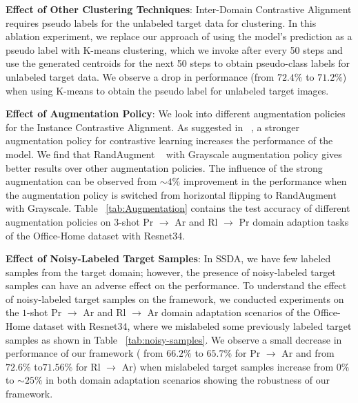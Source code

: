 \noindent\textbf{Effect of Other Clustering Techniques}: Inter-Domain Contrastive Alignment requires pseudo labels for the unlabeled target data for clustering. In this ablation experiment, we replace our approach of using the model's prediction as a pseudo label with K-means clustering, which we invoke after every 50 steps and use the generated centroids for the next 50 steps to obtain pseudo-class labels for unlabeled target data. We observe a drop in performance (from $72.4\%$ to $71.2\%$) when using K-means to obtain the pseudo label for unlabeled target images. 


\noindent \textbf{ Effect of Augmentation Policy}:
We look into different augmentation policies for the Instance Contrastive Alignment. As suggested in ~\cite{Chen2020ASF}, a stronger augmentation policy for contrastive learning increases the performance of the model. We find that RandAugment ~\cite{Cubuk2020RandaugmentPA} with Grayscale augmentation policy gives better results over other augmentation policies. The influence of the strong augmentation can be observed from  $\sim 4\%$ improvement in the performance when the augmentation policy is switched from horizontal flipping to RandAugment with Grayscale. Table ~\ref{tab:Augmentation} contains the test accuracy of different augmentation policies on $3$-shot Pr $\rightarrow$ Ar and Rl $\rightarrow$ Pr domain adaption tasks of the Office-Home dataset with Resnet34.


\noindent \textbf{ Effect of Noisy-Labeled Target Samples}: In SSDA, we have few labeled samples from the target domain; however, the presence of noisy-labeled target samples can have an adverse effect on the performance. To understand the effect of noisy-labeled target samples on the framework, we conducted experiments on the $1$-shot Pr $\rightarrow$ Ar and Rl $\rightarrow$ Ar domain adaptation scenarios of the Office-Home dataset with Resnet34, where we mislabeled some previously labeled target samples as shown in Table ~\ref{tab:noisy-samples}. We observe a small decrease in performance of our framework ( from $66.2\%$ to $65.7\%$ for Pr $\rightarrow$ Ar and from  $72.6\%$ to$71.56\%$ for Rl $\rightarrow$ Ar) when mislabeled target samples increase from $0\%$ to $\sim 25\%$ in both domain adaptation scenarios showing the robustness of our framework.
\begin{table}[t]
\renewcommand{\arraystretch}{1.2}
    \centering
    \caption{\textbf{Ablation study to understand the effect of outliers in target domain.} Numbers show the test accuracy of $1$-shot domain adaptation tasks of the Office-Home dataset with Resnet34.}
    \label{tab:noisy-samples}
\end{table}
